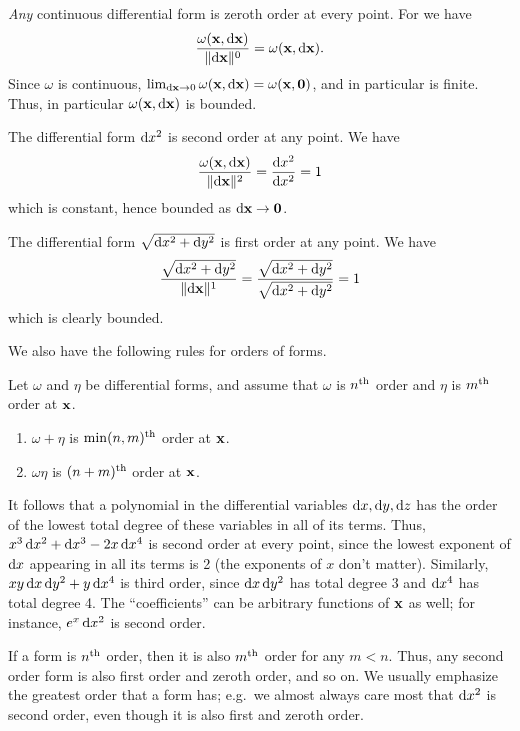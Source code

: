 \documentclass[12pt]{amsart}
\begin{document}
\begin{eg}
  \emph{Any} continuous differential form is zeroth order at every point.
  For we have
  \[\frac{\omega(\mathbf{x},\mathrm{d} \mathbf{x})}{\Vert \mathrm{d} \mathbf{x} \Vert^0} = \omega(\mathbf{x},\mathrm{d} \mathbf{x}).\]
  Since $\omega$ is continuous, $\lim_{\mathrm{d} \mathbf{x}\to 0} \omega(\mathbf{x},\mathrm{d} \mathbf{x}) = \omega(\mathbf{x},\mathbf{0})$, and in particular is finite.
  Thus, in particular $\omega(\mathbf{x},\mathrm{d} \mathbf{x})$ is bounded.
\end{eg}

\begin{eg}
  The differential form $\mathrm{d} x^2$ is second order at any point.
  We have
  \[ \frac{\omega(\mathbf{x},\mathrm{d} \mathbf{x})}{\Vert \mathrm{d} \mathbf{x} \Vert^2} = \frac{\mathrm{d} x^2}{\mathrm{d} x^2} = 1 \]
  which is constant, hence bounded as $\mathrm{d} \mathbf{x}\to\mathbf{0}$.
\end{eg}

\begin{eg}
  The differential form $\sqrt{\mathrm{d} x^2+\mathrm{d} y^2}$ is first order at any point.
  We have
  \[ \frac{\sqrt{\mathrm{d} x^2+\mathrm{d} y^2}}{\Vert \mathrm{d} \mathbf{x} \Vert^1} =
  \frac{\sqrt{\mathrm{d} x^2+\mathrm{d} y^2}}{\sqrt{\mathrm{d} x^2+\mathrm{d} y^2}} = 1
  \]
  which is clearly bounded.
\end{eg}

We also have the following rules for orders of forms.

\begin{thm}
  Let $\omega$ and $\eta$ be differential forms, and assume that $\omega$ is $n^{\mathrm{th}}$ order and $\eta$ is $m^{\mathrm{th}}$ order at $\mathbf{x}$.
  \begin{enumerate}
  \item $\omega+\eta$ is $\min(n,m)^{\mathrm{th}}$ order at $\mathbf{x}$.
  \item $\omega\eta$ is $(n+m)^{\mathrm{th}}$ order at $\mathbf{x}$.
  \end{enumerate}
\end{thm}

It follows that a polynomial in the differential variables $\mathrm{d} x,\mathrm{d} y,\mathrm{d} z$ has the order of the lowest total degree of these variables in all of its terms.
Thus, $x^3\, \mathrm{d} x^2 + \mathrm{d} x^3 - 2x \,\mathrm{d} x^4$ is second order at every point, since the lowest exponent of $\mathrm{d} x$ appearing in all its terms is 2 (the exponents of $x$ don't matter).
Similarly, $xy\,\mathrm{d} x\,\mathrm{d} y^2 + y\, \mathrm{d} x^4$ is third order, since $\mathrm{d} x\,\mathrm{d} y^2$ has total degree 3 and $\mathrm{d} x^4$ has total degree 4.
The ``coefficients'' can be arbitrary functions of $\mathbf{x}$ as well; for instance, $e^x \,\mathrm{d} x^2$ is second order.

\begin{rmk}
  If a form is $n^{\mathrm{th}}$ order, then it is also $m^{\mathrm{th}}$ order for any $m<n$.
  Thus, any second order form is also first order and zeroth order, and so on.
  We usually emphasize the greatest order that a form has; e.g.\ we almost always care most that $\mathrm{d} x^2$ is second order, even though it is also first and zeroth order.
\end{rmk}
\end{document}
